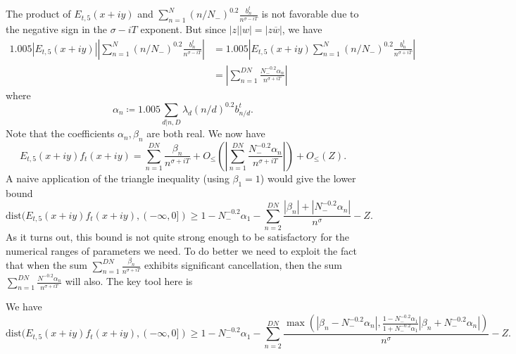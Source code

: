 The product of $E_{t,5}(x+iy)$ and $\sum_{n=1}^N (n/N_-)^{0.2} \frac{b_n^t}{n^{\sigma-iT}}$ is not favorable due to the negative sign in the $\sigma-iT$ exponent.  But since $|z| |w| = |z \overline{w}|$, we have
\begin{align*}
1.005 |E_{t,5}(x+iy)| |\sum_{n=1}^N (n/N_-)^{0.2} \frac{b_n^t}{n^{\sigma-iT}}|  &=
1.005 |E_{t,5}(x+iy) \sum_{n=1}^N (n/N_-)^{0.2} \frac{b_n^t}{n^{\sigma+iT}}|  \\
&= |\sum_{n=1}^{DN} \frac{N_-^{-0.2} \alpha_{n}}{n^{\sigma+iT}}|
\end{align*}
where
$$ \alpha_{n} \coloneqq 1.005 \sum_{d|n,D} \lambda_d (n/d)^{0.2} b_{n/d}^t.$$
Note that the coefficients $\alpha_{n}, \beta_n$ are both real.  We now have
\begin{equation}\label{ets}
 E_{t,5}(x+iy) f_t(x+iy) = \sum_{n=1}^{DN} \frac{\beta_n}{n^{\sigma+iT}} + O_{\leq}( |\sum_{n=1}^{DN} \frac{N_-^{-0.2} \alpha_{n}}{n^{\sigma+iT}}| ) + O_{\leq}(Z).
\end{equation}
A naive application of the triangle inequality (using $\beta_1=1$) would give the lower bound
$$ \mathrm{dist}(E_{t,5}(x+iy) f_t(x+iy), (-\infty,0]) \geq 1 - N_-^{-0.2} \alpha_{1} - \sum_{n=2}^{DN} \frac{|\beta_n| + |N_-^{-0.2} \alpha_{n}|}{n^{\sigma}} - Z.$$
As it turns out, this bound is not quite strong enough to be satisfactory for the numerical ranges of parameters we need.  To do better we need to exploit the fact that when the sum $\sum_{n=1}^{DN} \frac{\beta_n}{n^{\sigma+iT}}$ exhibits significant cancellation, then the sum $\sum_{n=1}^{DN} \frac{N^{-0.2} \alpha_{n}}{n^{\sigma+iT}}$ will also. The key tool here is

\begin{lemma}  We have
$$ \mathrm{dist}(E_{t,5}(x+iy) f_t(x+iy), (-\infty,0]) \geq 1 - N_-^{-0.2} \alpha_{1} - \sum_{n=2}^{DN} \frac{\max(|\beta_n-N_-^{-0.2} \alpha_{n}|, \frac{1-N_-^{-0.2} \alpha_{1}}{1+N_-^{-0.2} \alpha_{1}} |\beta_n+N_-^{-0.2} \alpha_{n}|)}{n^{\sigma}} - Z.$$
\end{lemma}

